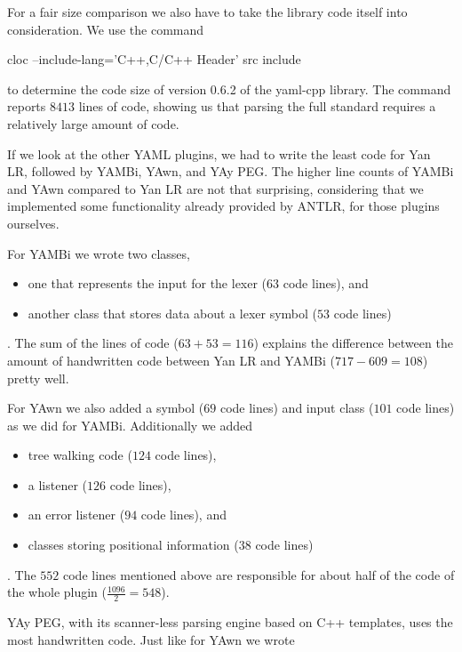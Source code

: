 For a fair size comparison we also have to take the library code itself into consideration. We use the command

\begin{shellcode}
  cloc --include-lang='C++,C/C++ Header' src include
\end{shellcode}

to determine the code size of version 0.6.2 of the yaml-cpp library. The command reports $8413$ lines of code, showing us that parsing the full  standard requires a relatively large amount of code.

If we look at the other YAML plugins, we had to write the least code for Yan LR, followed by YAMBi, YAwn, and YAy PEG. The higher line counts of YAMBi and YAwn compared to Yan LR are not that surprising, considering that we implemented some functionality already provided by ANTLR, for those plugins ourselves.

For YAMBi we wrote two classes,

\begin{itemize}
  \item one that represents the input for the lexer ($63$ code lines), and
  \item another class that stores data about a lexer symbol ($53$ code lines)
\end{itemize}

. The sum of the lines of code ($63 + 53 = 116$) explains the difference between the amount of handwritten code between Yan LR and YAMBi ($717 - 609 = 108$) pretty well.

For YAwn we also added a symbol ($69$ code lines) and input class ($101$ code lines) as we did for YAMBi. Additionally we added

\begin{itemize}
  \item tree walking code ($124$ code lines),
  \item a listener ($126$ code lines),
  \item an error listener ($94$ code lines), and
  \item classes storing positional information ($38$ code lines)
\end{itemize}

. The $552$ code lines mentioned above are responsible for about half of the code of the whole plugin ($\frac{1096}{2} = 548$).

YAy PEG, with its scanner-less parsing engine based on C++ templates, uses the most handwritten code. Just like for YAwn we wrote

